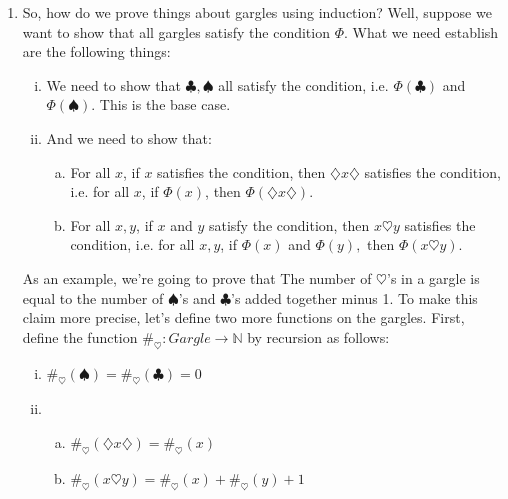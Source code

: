 \begin{enumerate}[{\thesection}.1]
		\item So, how do we prove things about gargles using induction? Well, suppose we want to show that all gargles satisfy the condition $\Phi$. What we need establish are the following things:
		
		\begin{enumerate}[(i)]
		
				\item We need to show that $\clubsuit,\spadesuit$ all satisfy the condition, i.e. $\Phi(\clubsuit)$ and $\Phi(\spadesuit)$. This is the base case.
				
				\item And we need to show that:
				
						\begin{enumerate}[(a)]
							
							\item For all $x$, if $x$ satisfies the condition, then $\diamondsuit x\diamondsuit$ satisfies the condition, i.e. for all $x$, if $\Phi(x)$, then $\Phi(\diamondsuit x\diamondsuit)$. 
							
							\item For all $x,y$, if $x$ and $y$ satisfy the condition, then $ x\heartsuit y$ satisfies the condition, i.e. for all $x,y$, if $\Phi(x)$ and $\Phi(y),$ then $\Phi( x\heartsuit y)$.

						\end{enumerate}
		
		\end{enumerate}
		
	As an example, we're going to prove that The number of $\heartsuit$'s in a gargle is equal to the number of $\spadesuit$'s and $\clubsuit$'s added together minus 1. To make this claim more precise, let's define two more functions on the gargles. First, define the function $\#_\heartsuit:Gargle\to\mathbb{N}$ by recursion as follows:
	\begin{enumerate}[(i)]
	
		\item $\#_\heartsuit(\spadesuit)=\#_\heartsuit(\clubsuit)=0$
		
		\item \begin{enumerate}[(a)]

			\item $\#_\heartsuit(\diamondsuit x\diamondsuit)=\#_\heartsuit(x)$
			
			\item $\#_\heartsuit(x\heartsuit y)=\#_\heartsuit(x)+\#_\heartsuit(y)+1$


\end{enumerate}
\end{enumerate}
\end{enumerate}
